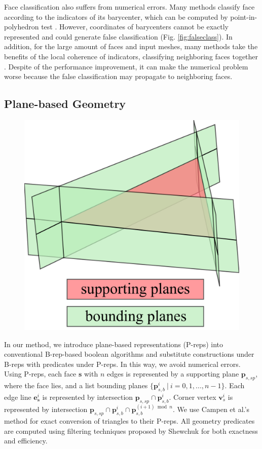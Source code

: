 \documentclass[10pt,journal,compsoc]{IEEEtran}
\begin{document}
Face classification also suffers from numerical errors. Many methods classify face according to the indicators of its barycenter, which can be computed by point-in-polyhedron test \cite{feito2013fast,campen2010exact}. However, coordinates of barycenters cannot be exactly represented and could generate false classification (Fig. \ref{fig:falseclass}). In addition, for the large amount of faces and input meshes, many methods take the benefits of the local coherence of indicators, classifying neighboring faces together \cite{pavic2010hybrid,feito2013fast,ogayar2015deferred,zhou2016mesh}. Despite of the performance improvement, it can make the numerical problem worse because the false classification may propagate to neighboring faces.


\subsection{Plane-based Geometry}

\begin{figure}
\includegraphics[width=1.5 in]{p-reps}
\end{figure}

In our method, we introduce plane-based representations (P-reps) into conventional B-rep-based boolean algorithms and substitute constructions under B-reps with predicates under P-reps. In this way, we avoid numerical errors. Using P-reps, each face $\bm{s}$ with $n$ edges is represented by a supporting plane $\bm{p}_{s,sp}$, where the face lies, and a list bounding planes $\{\bm{p}_{s,b}^i \ \vert\  i = 0, 1,...,n-1\}$. Each edge line $\bm{e}_{\bm{s}}^i$ is represented by intersection $\bm{p}_{s,sp} \cap \bm{p}_{s,b}^i$. Corner vertex $\bm{v}_s^i$ is represented by intersection $\bm{p}_{s,sp} \cap \bm{p}_{s,b}^i \cap \bm{p}_{s,b}^{{(i+1)}\bmod{n}}$. We use Campen et al.'s method \cite{campen2010exact} for exact conversion of triangles to their P-reps. All geometry predicates are computed using filtering techniques proposed by Shewchuk \cite{shewchuk1997adaptive} for both exactness and efficiency.
\end{document}
